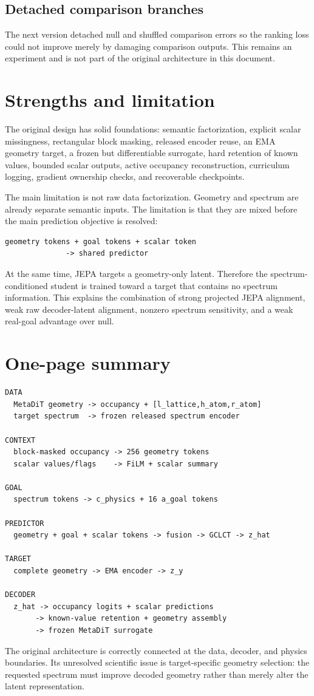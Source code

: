 \documentclass[11pt,a4paper]{article}
\begin{document}
\subsection{Detached comparison branches}
The next version detached null and shuffled comparison errors so the ranking loss
could not improve merely by damaging comparison outputs. This remains an
experiment and is not part of the original architecture in this document.

\section{Strengths and limitation}
The original design has solid foundations: semantic factorization, explicit
scalar missingness, rectangular block masking, released encoder reuse, an EMA
geometry target, a frozen but differentiable surrogate, hard retention of known
values, bounded scalar outputs, active occupancy reconstruction, curriculum
logging, gradient ownership checks, and recoverable checkpoints.

The main limitation is not raw data factorization. Geometry and spectrum are
already separate semantic inputs. The limitation is that they are mixed before
the main prediction objective is resolved:
\begin{lstlisting}
geometry tokens + goal tokens + scalar token
              -> shared predictor
\end{lstlisting}
At the same time, JEPA targets a geometry-only latent. Therefore the
spectrum-conditioned student is trained toward a target that contains no
spectrum information. This explains the combination of strong projected JEPA
alignment, weak raw decoder-latent alignment, nonzero spectrum sensitivity, and
a weak real-goal advantage over null.

\section{One-page summary}
\begin{lstlisting}
DATA
  MetaDiT geometry -> occupancy + [l_lattice,h_atom,r_atom]
  target spectrum  -> frozen released spectrum encoder

CONTEXT
  block-masked occupancy -> 256 geometry tokens
  scalar values/flags    -> FiLM + scalar summary

GOAL
  spectrum tokens -> c_physics + 16 a_goal tokens

PREDICTOR
  geometry + goal + scalar tokens -> fusion -> GCLCT -> z_hat

TARGET
  complete geometry -> EMA encoder -> z_y

DECODER
  z_hat -> occupancy logits + scalar predictions
       -> known-value retention + geometry assembly
       -> frozen MetaDiT surrogate
\end{lstlisting}

The original architecture is correctly connected at the data, decoder, and
physics boundaries. Its unresolved scientific issue is target-specific
geometry selection: the requested spectrum must improve decoded geometry rather
than merely alter the latent representation.
\end{document}
